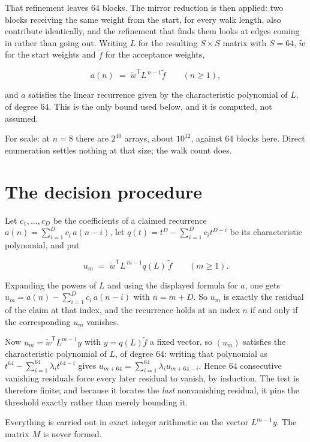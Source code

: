 \documentclass[11pt]{article}
\theoremstyle{definition}
\begin{document}
That refinement leaves $64$ blocks. The mirror reduction is then applied: two blocks receiving the same weight from the start, for every walk length, also contribute identically, and the refinement that finds them looks at edges coming in rather than going out. Writing $L$ for the resulting $S \times S$ matrix with $S = 64$, $\tilde w$ for the start weights and $\tilde f$ for the acceptance weights,

\[a(n) \;=\; \tilde w^{\mathsf T} L^{\,n-1} \tilde f \qquad (n \ge 1),\]

and $a$ satisfies the linear recurrence given by the characteristic polynomial of $L$, of degree $64$. This is the only bound used below, and it is computed, not assumed.

For scale: at $n = 8$ there are $2^{40}$ arrays, about $10^{12}$, against $64$ blocks here. Direct enumeration settles nothing at that size; the walk count does.

\section{The decision procedure}

Let $c_1,\dots,c_D$ be the coefficients of a claimed recurrence $a(n) = \sum_{i=1}^{D} c_i\,a(n-i)$, let $q(t) = t^{D} - \sum_{i=1}^{D} c_i t^{D-i}$ be its characteristic polynomial, and put

\[u_m \;=\; \tilde w^{\mathsf T} L^{\,m-1} q(L)\,\tilde f \qquad (m \ge 1).\]

Expanding the powers of $L$ and using the displayed formula for $a$, one gets $u_m = a(n) - \sum_{i=1}^{D} c_i\,a(n-i)$ with $n = m + D$. So $u_m$ is exactly the residual of the claim at that index, and the recurrence holds at an index $n$ if and only if the corresponding $u_m$ vanishes.

Now $u_m = \tilde w^{\mathsf T} L^{m-1} y$ with $y = q(L)\tilde f$ a fixed vector, so $(u_m)$ satisfies the characteristic polynomial of $L$, of degree $64$: writing that polynomial as $t^{64} - \sum_{i=1}^{64} \lambda_i t^{64-i}$ gives $u_{m+64} = \sum_{i=1}^{64} \lambda_i u_{m+64-i}$. Hence $64$ consecutive vanishing residuals force every later residual to vanish, by induction. The test is therefore finite; and because it locates the {\itshape last} nonvanishing residual, it pins the threshold exactly rather than merely bounding it.

Everything is carried out in exact integer arithmetic on the vector $L^{m-1}y$. The matrix $M$ is never formed.
\end{document}
